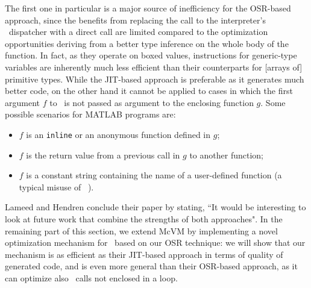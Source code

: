 The first one in particular is a major source of inefficiency for the OSR-based approach, since the benefits from replacing the call to the interpreter's \feval\ dispatcher with a direct call are limited compared to the optimization opportunities deriving from a better type inference on the whole body of the function. In fact, as they operate on boxed values, instructions for generic-type variables are inherently much less efficient than their counterparts for [arrays of] primitive types. While the JIT-based approach is preferable as it generates much better code, on the other hand it cannot be applied to cases in which the first argument $f$ to \feval\ is not passed as argument to the enclosing function $g$. Some possible scenarios for MATLAB programs are:
\begin{itemize}
\item $f$ is an {\tt inline} or an anonymous function defined in $g$;
\item $f$ is the return value from a previous call in $g$ to another function;
\item $f$ is a constant string containing the name of a user-defined function (a typical misuse of \feval ~\cite{radpour2013refactoring}).
\end{itemize}
 
Lameed and Hendren conclude their paper by stating, ``It would be interesting to look at future work that combine the
strengths of both approaches". In the remaining part of this section, we extend McVM by implementing a novel optimization mechanism for \feval\ based on our OSR technique: we will show that our mechanism is as efficient as their JIT-based approach in terms of quality of generated code, and is even more general than their OSR-based approach, as it can optimize also \feval\ calls not enclosed in a loop.
\fi

